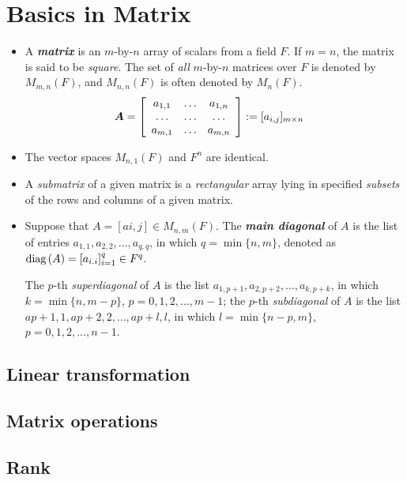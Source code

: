 \documentclass[11pt]{article}
\begin{document}
\section{Basics in Matrix}
\begin{itemize}
\item A \emph{\textbf{matrix}} is an $m$-by-$n$ array of scalars from a field $F$. If $m = n$, the matrix is said to be \emph{square}. The set of \emph{all} $m$-by-$n$ matrices over $F$ is denoted by $M_{m,n}(F)$, and $M_{n,n}(F)$ is often denoted by $M_n(F)$. 
\begin{align*}
\boldsymbol{A} &= \left[\begin{array}{ccc}
a_{1,1}& \ldots& a_{1,n}\\
\ldots & \ldots & \ldots \\
a_{m,1}& \ldots& a_{m,n}
\end{array}\right] := [a_{i,j}]_{m \times n}
\end{align*}

\item The vector spaces  $M_{n,1}(F)$ and $F^n$ are identical. 

\item A \emph{submatrix} of a given matrix is a \emph{rectangular} array lying in specified \emph{subsets} of the rows and columns of a given matrix. 

\item Suppose that $A = [a{i,j}] \in M_{n,m}(F)$. The \emph{\textbf{main diagonal}} of $A$ is the list of entries $a_{1,1}, a_{2,2}, \ldots, a_{q,q}$, in which $q = \min\{n, m\}$, denoted as $\text{diag}\left(A\right) = [a_{i.i}]_{i=1}^{q} \in F^q$.

The $p$-th \emph{superdiagonal} of $A$ is the list $a_{1, p+1}, a_{2, p+2}, \ldots , a_{k, p+k}$, in which $k = \min\{n, m - p\}$, $p = 0, 1, 2, \ldots, m-1$; 
the $p$-th \emph{subdiagonal} of $A$ is the list $a{p+1,1}, a{p+2,2}, \ldots, a{p+l,l}$, in which $l= \min\{n - p, m\}$, $p = 0, 1, 2, . . . , n - 1$.
\end{itemize}

\subsection{Linear transformation}

\subsection{Matrix operations}


\subsection{Rank}
\end{document}
